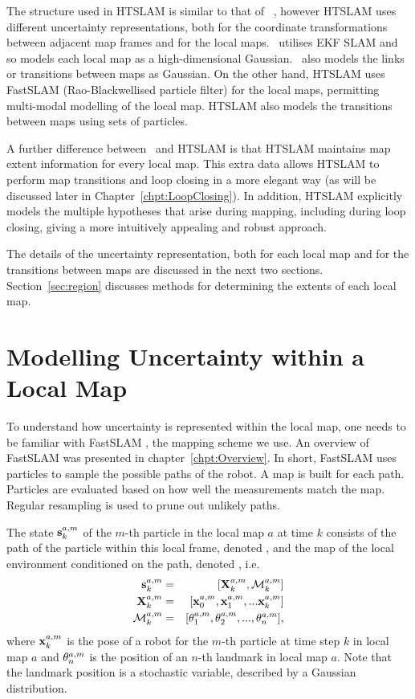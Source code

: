 The structure used in HTSLAM is similar to that of \Atlas\ 
\cite{bosse02atlas}, however HTSLAM uses different uncertainty
representations, both for the coordinate transformations between
adjacent map frames and for the local maps. \Atlas\ utilises EKF SLAM
and so models each local map as a high-dimensional Gaussian.
\Atlas\ also models the links or transitions between maps as Gaussian.  On
the other hand, HTSLAM uses FastSLAM (Rao-Blackwellised particle
filter) for the local maps, permitting multi-modal modelling of the
local map.  HTSLAM also models the transitions between maps using sets
of particles.

A further difference between \Atlas\ and HTSLAM is that HTSLAM
maintains map extent information for every local map. This extra data
allows HTSLAM to perform map transitions and loop closing in a more
elegant way (as will be discussed later in
Chapter~\ref{chpt:LoopClosing}).  In addition, HTSLAM explicitly
models the multiple hypotheses that arise during mapping, including
during loop closing, giving a more intuitively appealing and robust
approach.

The details of the uncertainty representation, both for each local map
and for the transitions between maps are discussed in the next two
sections.  Section~\ref{sec:region} discusses methods for
determining the extents of each local map.

\section{Modelling Uncertainty within a Local Map}
\label{sec:local_map}

To understand how uncertainty is represented within the local map, one
needs to be familiar with FastSLAM \cite{Montemerlo02d}, the mapping
scheme we use. An overview of FastSLAM was presented in
chapter~\ref{chpt:Overview}. In short, FastSLAM uses particles to
sample the possible paths of the robot. A map is built for each
path. Particles are evaluated based on how well the measurements match
the map.  Regular resampling is used to prune out unlikely paths.

The state $\s{k}{a}{m}$ of the $m$-th particle in the local map $a$
at time $k$ consists of the path of the particle within this local
frame, denoted \Xall{k}{a}{m}, and the map of the local environment
conditioned on the path, denoted \map{k}{a}{m}, i.e.
\begin{eqnarray}
 \s{k}{a}{m}    &=& [\Xall{k}{a}{m}, \map{k}{a}{m} ]\\
 \Xall{k}{a}{m} &=& [\x{0}{a}{m}, \x{1}{a}{m}, ... \x{k}{a}{m}]\\
 \map{k}{a}{m}  &=& [\mape{a}{m}{1}, \mape{a}{m}{2}, ..., \mape{a}{m}{n}],
\end{eqnarray}
where $\x{k}{a}{m}$ is the pose of a robot for the $m$-th particle at
time step $k$ in local map $a$ and $\mape{a}{m}{n}$ is the position
of an $n$-th landmark in local map $a$. Note that the landmark
position is a stochastic variable, described by a Gaussian
distribution.

